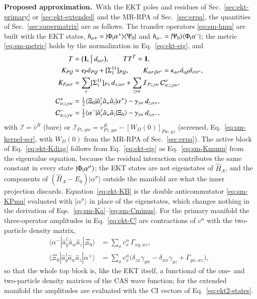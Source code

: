 \documentclass[aip,jcp,reprint,noshowkeys,superscriptaddress]{revtex4-1}
\newcommand{\Proposed}{\textbf{Proposed approximation.}\ }
\begin{document}
\Proposed With the EKT poles and residues of Sec.~\ref{sec:ekt-primary} or
\ref{sec:ekt-extended} and the MR-RPA of Sec.~\ref{sec:erpa}, the
quantities of Sec.~\ref{sec:supermatrix} are as follows.  The transfer
operators \eqref{eq:sm-hmu} are built with the EKT states,
$h_{\alpha+}=|\Phi_{\rm i}\alpha^+\rangle\langle\Psi_0|$ and
$h_{\alpha-}=|\Psi_0\rangle\langle\Phi_{\rm i}\alpha^-|$; the metric
\eqref{eq:sm-metric} holds by the normalization in
Eq.~\eqref{eq:ekt-eig}, and
\begin{align}
  T&=\bigl(\mathbf 1_{\rm i}\ \big|\ d_{\alpha\sigma}\bigr),\qquad TT^{T}=\mathbf 1,
  \label{eq:ekt-T}\\
  K_{PQ}&=\epsilon_P\delta_{PQ}+[\Sigma^{11}_1]_{PQ},\qquad
  K_{\alpha\sigma,\beta\sigma'}=\kappa_{\alpha\sigma}\delta_{\alpha\beta}\delta_{\sigma\sigma'},
  \label{eq:ekt-Kdiag}\\
  K_{P,\alpha\sigma}&=\sum_x[\Sigma^{11}_1]_{Px}\,d_{x,\alpha\sigma}
  +\sum_{zyw}\mathcal I_{Pz,yw}\,\mathcal C^{\sigma}_{\alpha;z,yw},
  \label{eq:ekt-KB}\\
  \mathcal C^{+}_{\alpha;z,yw}&=\tfrac12\langle\Xi_0|\hat a_y^\dagger\hat a_w\hat a_z|\alpha^+\rangle-\gamma_{yw}\,d_{z,\alpha+},
  \nonumber\\
  \mathcal C^{-}_{\alpha;z,yw}&=\tfrac12\langle\alpha^-|\hat a_y^\dagger\hat a_w\hat a_z|\Xi_0\rangle-\gamma_{yw}\,d_{z,\alpha-},
  \label{eq:ekt-C}
\end{align}
with $\mathcal I=\bar v^R$ (bare) or
$\mathcal I_{Pz,yw}=v^R_{Pz,yw}-[W_D(0)]_{Pw,yz}$ (screened,
Eq.~\eqref{eq:sm-kernel-scr}, with $W_D(0)$ from the MR-RPA of
Sec.~\ref{sec:erpa}).  The active block of Eq.~\eqref{eq:ekt-Kdiag}
follows from Eq.~\eqref{eq:ekt-eig} as Eq.~\eqref{eq:sm-Kmunu} from the
eigenvalue equation, because the residual interaction contributes the same
constant in every state $|\Phi_{\rm i}\alpha^{\sigma}\rangle$; the EKT
states are not eigenstates of $\hat H_A$, and the components of
$(\hat H_A-E_0)|\alpha^{\sigma}\rangle$ outside the manifold are what the
inner projection discards.  Equation~\eqref{eq:ekt-KB} is the double
anticommutator \eqref{eq:sm-KPmu} evaluated with $|\alpha^{\sigma}\rangle$
in place of the eigenstates, which changes nothing in the derivation of
Eqs.~\eqref{eq:sm-Ka}--\eqref{eq:sm-Cminus}.  For the primary manifold the
three-operator amplitudes in Eq.~\eqref{eq:ekt-C} are contractions of
$c^{\alpha}$ with the two-particle density matrix,
\begin{align}
  \langle\alpha^-|\hat a_y^\dagger\hat a_w\hat a_z|\Xi_0\rangle&=\sum_xc^{\alpha}_x\,\Gamma_{xy,wz},
  \nonumber\\
  \langle\Xi_0|\hat a_y^\dagger\hat a_w\hat a_z|\alpha^+\rangle&=\sum_xc^{\alpha}_x\bigl(\delta_{zx}\gamma_{yw}-\delta_{wx}\gamma_{yz}+\Gamma_{yx,wz}\bigr),
  \label{eq:ekt-C-rdm}
\end{align}
so that the whole top block is, like the EKT itself, a functional of the
one- and two-particle density matrices of the CAS wave function; for the
extended manifold the amplitudes are evaluated with the CI vectors of
Eq.~\eqref{eq:ekt2-states}.
\end{document}
